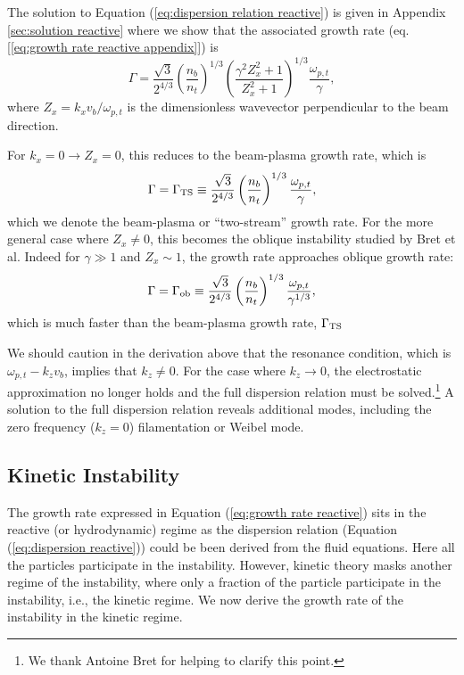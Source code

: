 \documentclass[usenatbib,iop,apj,numberedappendix]{aeb_emulateapj_2010}
\begin{document}
The solution to Equation (\ref{eq:dispersion relation reactive}) is given in Appendix \ref{sec:solution reactive} where we show that the associated growth rate (eq.[\ref{eq:growth rate reactive appendix}]) is 
\begin{equation}\label{eq:growth rate reactive}
 \Gamma = \frac{\sqrt{3}}{2^{4/3}}\left(\frac{n_b}{n_t}\right)^{1/3}\left(\frac{\gamma^2 Z_x^2 + 1}{Z_x^2 + 1}\right)^{1/3}\frac{\omega_{p,t}}{\gamma},
\end{equation}
where $Z_x = k_xv_b/\omega_{p,t}$ is the dimensionless wavevector perpendicular to the beam direction.

For $k_x = 0 \rightarrow Z_x = 0$, this reduces to the beam-plasma growth rate, which is
\begin{equation}\label{eq:growth rate bp}
 \Gamma = \Gamma_{\rm TS} \equiv \frac{\sqrt{3}}{2^{4/3}}\left(\frac{n_b}{n_t}\right)^{1/3}\frac{\omega_{p,t}}{\gamma},
\end{equation}
which we denote the beam-plasma or ``two-stream'' growth rate.
For the more general case where $Z_x\ne 0$, this becomes the oblique instability studied by Bret et al.  Indeed for $\gamma \gg 1$ and $Z_x \sim 1$, the growth rate approaches oblique growth rate:
\begin{equation}
 \Gamma = \Gamma_{\rm ob} \equiv \frac{\sqrt{3}}{2^{4/3}}\left(\frac{n_b}{n_t}\right)^{1/3}\frac{\omega_{p,t}}{\gamma^{1/3}},
\end{equation}
which is much faster than the beam-plasma growth rate, $\Gamma_{\rm TS}$

We should caution in the derivation above that the resonance condition, which is $\omega_{p,t} - k_z v_b$, implies that $k_z \neq 0$.  For the case where $k_z \rightarrow 0$, the electrostatic approximation no longer holds and the full dispersion relation must be solved.\footnote{We thank Antoine Bret for helping to clarify this point.}  A solution to the full dispersion relation reveals additional modes, including the zero frequency ($k_z = 0$) filamentation or Weibel mode. 

\subsection{Kinetic Instability}

The growth rate expressed in Equation (\ref{eq:growth rate reactive}) sits in the reactive (or hydrodynamic) regime as the dispersion relation (Equation (\ref{eq:dispersion reactive})) could be been derived from the fluid equations.  Here all the particles participate in the instability.  However, kinetic theory masks another regime of the instability, where only a fraction of the particle participate in the instability, i.e., the kinetic regime.  We now derive the growth rate of the instability in the kinetic regime.  
\end{document}
